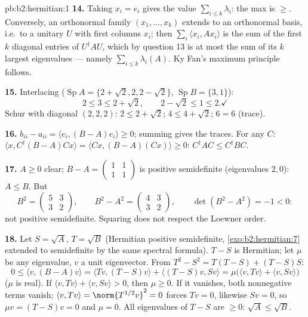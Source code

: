 \begin{solution}{pb:b2:hermitian:1}
\textbf{14.} Taking $x_i = e_i$ gives the value
$\sum_{i\leq k}\lambda_i$: the max is $\geq$. Conversely, an
orthonormal family $(x_1, \dots, x_k)$ extends to an
orthonormal basis, i.e.\ to a unitary $U$ with first columns
$x_i$; then $\sum_i\langle x_i, Ax_i\rangle$ is the sum of the
first $k$ diagonal entries of $U^\dagger AU$, which by question
13 is at most the sum of its $k$ largest eigenvalues ---
namely $\sum_{i\leq k}\lambda_i(A)$. Ky Fan's maximum
principle follows.

\textbf{15.} Interlacing ($\operatorname{Sp}A = \{2+\sqrt2, 2,
2-\sqrt2\}$, $\operatorname{Sp}B = \{3, 1\}$):
\[
2 \leq 3 \leq 2 + \sqrt2,
\qquad
2 - \sqrt2 \leq 1 \leq 2 . \checkmark
\]
Schur with diagonal $(2,2,2)$: $2 \leq 2+\sqrt2$; $4 \leq 4 +
\sqrt2$; $6 = 6$ (trace). \checkmark

\textbf{16.} $b_{ii} - a_{ii} = \langle e_i, (B-A)e_i\rangle
\geq 0$; summing gives the traces. For any $C$: $\langle x,
C^\dagger(B - A)Cx\rangle = \langle Cx, (B-A)(Cx)\rangle \geq
0$: $C^\dagger AC \leq C^\dagger BC$.

\textbf{17.} $A \geq 0$ clear; $B - A = \begin{pmatrix} 1 & 1\\
1 & 1\end{pmatrix}$ is positive semidefinite (eigenvalues $2,
0$): $A \leq B$. But
\[
B^2 = \begin{pmatrix} 5 & 3\\ 3 & 2\end{pmatrix},
\qquad
B^2 - A^2 = \begin{pmatrix} 4 & 3\\ 3 & 2\end{pmatrix},
\qquad \det(B^2 - A^2) = -1 < 0 :
\]
not positive semidefinite. Squaring does not respect the
Loewner order.

\textbf{18.} Let $S = \sqrt A$, $T = \sqrt B$ (Hermitian
positive semidefinite, \cref{exo:b2:hermitian:7} extended to
semidefinite by the same spectral formula). $T - S$ is
Hermitian; let $\mu$ be any eigenvalue, $v$ a unit eigenvector.
From $T^2 - S^2 = T(T - S) + (T - S)S$:
\[
0 \leq \langle v, (B - A)v\rangle
= \langle Tv, (T-S)v\rangle + \langle (T-S)v, Sv\rangle
= \mu\bigl(\langle v, Tv\rangle + \langle v,
Sv\rangle\bigr)
\]
($\mu$ is real). If $\langle v, Tv\rangle + \langle v,
Sv\rangle > 0$, then $\mu \geq 0$. If it vanishes, both
nonnegative terms vanish; $\langle v, Tv\rangle =
\norm{T^{1/2}v}^2 = 0$ forces $Tv = 0$, likewise $Sv = 0$, so
$\mu v = (T - S)v = 0$ and $\mu = 0$. All eigenvalues of $T -
S$ are $\geq 0$: $\sqrt A \leq \sqrt B$.


\end{solution}
